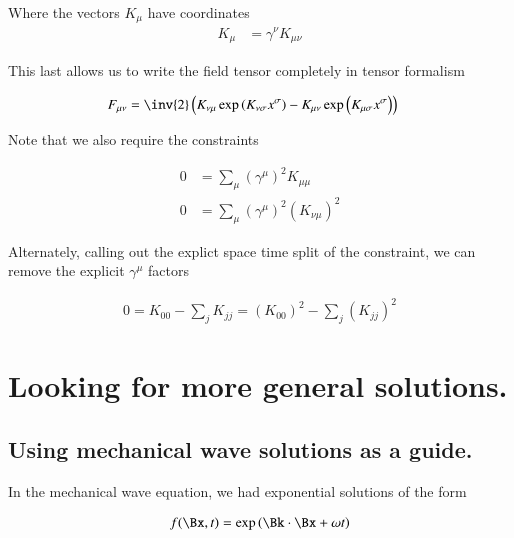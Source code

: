\documentclass{article}
\begin{document}
Where the vectors $K_\mu$ have coordinates
\begin{align}\label{eqn:WorkingSolutionDefinitions}
K_\mu &= \gamma^\nu K_{\mu\nu} 
\end{align}

This last allows us to write the field tensor completely in tensor formalism

\begin{align*}
F_{\mu\nu} &= \inv{2} \left( K_{\nu\mu} \exp\left( K_{\nu\sigma} x^\sigma \right) - K_{\mu\nu} \exp\left( K_{\mu\sigma} x^\sigma \right) \right)
\end{align*}

Note that we also require the constraints

\begin{align}\label{eqn:WorkingSolutionConstraints}
0 &= \sum_\mu (\gamma^\mu)^2 K_{\mu\mu} \\
0 &= \sum_\mu (\gamma^\mu)^2 (K_{\nu\mu})^2
\end{align}

Alternately, calling out the explict space time split of the constraint, we can
remove the explicit $\gamma^\mu$ factors 

\begin{align*}
0 = K_{00} - \sum_j K_{jj} = (K_{00})^2 - \sum_j (K_{jj} )^2
\end{align*}

%
%

\section{ Looking for more general solutions. }

\subsection{ Using mechanical wave solutions as a guide. }

In the mechanical wave equation, we had exponential solutions of the form

\begin{align*}
f(\Bx,t) = \exp\left( \Bk \cdot \Bx + \omega t \right)
\end{align*}
\end{document}
